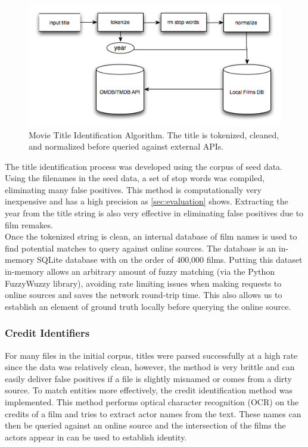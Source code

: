 \documentclass[paper=a4, fontsize=11pt]{scrartcl} %
\numberwithin{equation}{section} %
\numberwithin{figure}{section} %
\numberwithin{table}{section} %
\begin{document}
\begin{figure}[H]
\center\includegraphics[scale=0.90]{title-identifier.png}
\caption{Movie Title Identification Algorithm. The title is tokenized, cleaned, and normalized before queried against external APIs.}
\label{fig:title-identifier}
\end{figure}


The title identification process was developed using the corpus of seed data. Using the filenames in the seed data, a set of stop words was compiled, eliminating many false positives. This method is computationally very inexpensive and has a high precision as \ref{sec:evaluation} shows. Extracting the year from the title string is also very effective in eliminating false positives due to film remakes. \\

Once the tokenized string is clean, an internal database of film names is used to find potential matches to query against online sources. The database is an in-memory SQLite database with on the order of 400,000 films. Putting this dataset in-memory allows an arbitrary amount of fuzzy matching (via the Python FuzzyWuzzy library), avoiding rate limiting issues when making requests to online sources and saves the network round-trip time. This also allows us to establish an element of ground truth locally before querying the online source. \\

\subsubsection{Credit Identifiers}
\label{sec:credit-identifier}

For many files in the initial corpus, titles were parsed successfully at a high rate since the data was relatively clean, however, the method is very brittle and can easily deliver false positives if a file is slightly misnamed or comes from a dirty source. To match entities more effectively, the credit identification method was implemented. This method performs optical character recognition (OCR) on the credits of a film and tries to extract actor names from the text. These names can then be queried against an online source and the intersection of the films the actors appear in can be used to establish identity. \\
\end{document}
